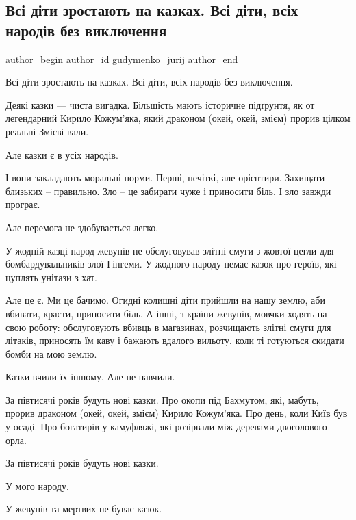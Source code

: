  
 
 
 
 

\subsection{Всі діти зростають на казках. Всі діти, всіх народів без виключення}
\label{sec:04_01_2023.fb.gudymenko_jurij.1.vs__d_ti_zrostayut_n}

\ifcmt
 author_begin
   author_id gudymenko_jurij
 author_end
\fi

Всі діти зростають на казках. Всі діти, всіх народів без виключення.

Деякі казки — чиста вигадка. Більшість мають історичне підґрунтя, як от
легендарний Кирило Кожум'яка, який драконом (окей, окей, змієм) прорив цілком
реальні Змієві вали. 

Але казки є в усіх народів.

І вони закладають моральні норми. Перші, нечіткі, але орієнтири. Захищати
близьких – правильно. Зло – це забирати чуже і приносити біль. І зло завжди
програє.

Але перемога не здобувається легко.

У жодній казці народ жевунів не обслуговував злітні смуги з жовтої цегли для
бомбардувальників злої Гінгеми. У жодного народу немає казок про героїв, які
цуплять унітази з хат. 

Але це є. Ми це бачимо. Огидні колишні діти прийшли на нашу землю, аби вбивати,
красти, приносити біль. А інші, з країни жевунів, мовчки ходять на свою роботу:
обслуговують вбивць в магазинах, розчищають злітні смуги для літаків, приносять
їм каву і бажають вдалого вильоту, коли ті готуються скидати бомби на мою
землю.

Казки вчили їх іншому. Але не навчили.

За півтисячі років будуть нові казки. Про окопи під Бахмутом, які, мабуть,
прорив драконом (окей, окей, змієм) Кирило Кожум'яка. Про день, коли Київ був у
осаді. Про богатирів у камуфляжі, які розірвали між деревами двоголового орла. 

За півтисячі років будуть нові казки. 

У мого народу. 

У жевунів та мертвих не буває казок.
